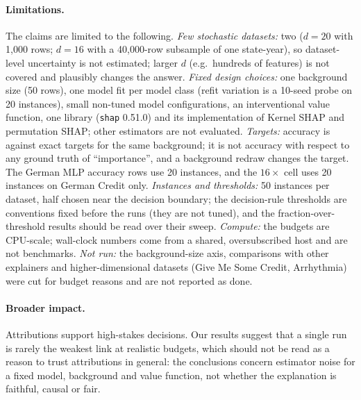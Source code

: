 \paragraph{Limitations.} The claims are limited to the following. \emph{Few stochastic datasets:} two ($d=20$ with 1{,}000 rows; $d=16$ with a 40{,}000-row subsample of one state-year), so dataset-level uncertainty is not estimated; larger $d$ (e.g.\ hundreds of features) is not covered and plausibly changes the answer. \emph{Fixed design choices:} one background size (50 rows), one model fit per model class (refit variation is a 10-seed probe on 20 instances), small non-tuned model configurations, an interventional value function, one library (\texttt{shap} 0.51.0) and its implementation of Kernel SHAP and permutation SHAP; other estimators \citep{covert2021improving,musco2025leverage} are not evaluated. \emph{Targets:} accuracy is against exact targets for the same background; it is not accuracy with respect to any ground truth of ``importance'', and a background redraw changes the target. The German MLP accuracy rows use 20 instances, and the $16\times$ cell uses 20 instances on German Credit only. \emph{Instances and thresholds:} 50 instances per dataset, half chosen near the decision boundary; the decision-rule thresholds are conventions fixed before the runs (they are not tuned), and the fraction-over-threshold results should be read over their sweep. \emph{Compute:} the budgets are CPU-scale; wall-clock numbers come from a shared, oversubscribed host and are not benchmarks. \emph{Not run:} the background-size axis, comparisons with other explainers and higher-dimensional datasets (Give Me Some Credit, Arrhythmia) were cut for budget reasons and are not reported as done.

\paragraph{Broader impact.} Attributions support high-stakes decisions. Our results suggest that a single run is rarely the weakest link at realistic budgets, which should not be read as a reason to trust attributions in general: the conclusions concern estimator noise for a fixed model, background and value function, not whether the explanation is faithful, causal or fair.
